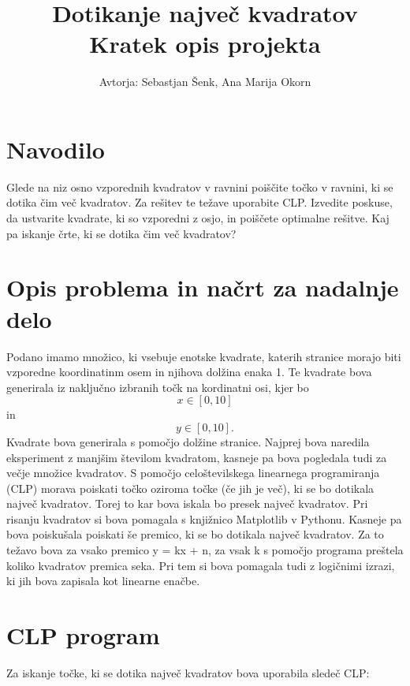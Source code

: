 \documentclass[a4, 12pt]{article}
\begin{document}
\title{ Dotikanje največ kvadratov  \\
  \large Kratek opis projekta}

\author{Avtorja: Sebastjan Šenk, Ana Marija Okorn}

\maketitle

\section{Navodilo}

Glede na niz osno vzporednih kvadratov v ravnini poiščite točko v ravnini, ki se dotika čim več kvadratov. Za rešitev te težave uporabite CLP. Izvedite poskuse, da ustvarite kvadrate, ki so vzporedni z osjo, in poiščete optimalne rešitve. Kaj pa iskanje črte, ki se dotika čim več kvadratov? 

\section{Opis problema in načrt za nadalnje delo}

Podano imamo množico, ki vsebuje enotske kvadrate, katerih stranice morajo biti vzporedne koordinatinm osem in njihova dolžina enaka 1. Te kvadrate bova generirala iz naključno izbranih točk na kordinatni osi, kjer bo\[ x \in [0,10]\] in \[y \in [0,10].\] Kvadrate bova generirala s pomočjo dolžine stranice. Najprej bova naredila eksperiment z manjšim številom kvadratom, kasneje pa bova pogledala tudi za večje množice kvadratov. S pomočjo celoštevilskega linearnega programiranja (CLP) morava poiskati točko oziroma točke (če jih je več), ki se bo dotikala največ kvadratov. Torej to kar bova iskala bo presek največ kvadratov. Pri risanju kvadratov si bova pomagala s knjižnico Matplotlib v Pythonu.  Kasneje pa bova poiskušala poiskati še premico, ki se bo dotikala največ kvadratov. Za to težavo bova za vsako premico y = kx + n, za vsak k s pomočjo programa preštela koliko kvadratov premica seka. Pri tem si bova pomagala tudi z logičnimi izrazi, ki jih bova zapisala kot linearne enačbe.

\section{CLP program}

Za iskanje točke, ki se dotika največ kvadratov bova uporabila sledeč CLP:\\
\end{document}
